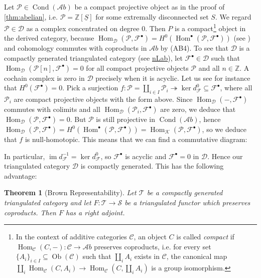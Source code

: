 \documentclass[11pt,A4]{article}
\theoremstyle{plain}
\newtheorem{thm}{Theorem}[section]
\theoremstyle{definition}
\theoremstyle{remark}
\newcommand{\Z}{\mathbb{Z}}
\newcommand{\1}{\mathbbm{1}}
\newcommand{\F}{\mathcal{F}}
\newcommand{\calP}{\mathcal{P}}
\newcommand{\scrC}{\mathscr{C}}
\newcommand{\Ab}{\mathscr{A}b}
\newcommand{\D}{\mathscr{D}}
\newcommand{\K}{\mathscr{K}}
\DeclareMathOperator{\Hom}{Hom}
\DeclareMathOperator{\Cond}{Cond}
\DeclareMathOperator{\Ob}{Ob}
\DeclareMathOperator{\im}{im}
\renewcommand{\u}[1]{\underline{#1}}
\newcommand{\grd}{^{\bullet}}
\begin{document}
Let $\calP\in \Cond(\Ab)$ be a compact projective object as in the proof of \cref{thm:abelian}, i.e. $\calP=\Z[\u{S}]$ for some extremally disconnected set $S$.
We regard $\calP\in \D$ as a complex concentrated on degree $0$.
Then $P$ is a compact\footnote{In the context of additive categories $\scrC$, an object $C$ is called \textit{compact} if $\Hom_{\scrC}(C,-)\colon \scrC\to \Ab$ preserves coproducts, i.e. for every set $\{A_{i}\}_{i\in I}\subseteq \Ob(\scrC)$ such that $\coprod_{i}A_{i}$ exists in $\scrC$, the canonical map $\coprod_{i}\Hom_{\scrC}(C,A_{i})\to \Hom_{\scrC}(C,\coprod_{i}A_{i})$ is a group isomorphism.} object in the derived category, because $\Hom_{\D}(\calP,\F\grd)=H^{0}(\Hom\grd(\calP,\F\grd))$ (see \cite[Proposition 1.4]{spa88}) and cohomology commutes with coproducts in $\Ab$ by (AB4).
To see that $\D$ is a compactly generated triangulated category (see \href{https://ncatlab.org/nlab/show/compactly+generated+triangulated+category}{nLab}), let $\F\grd\in \D$ such that $\Hom_{\D}(\calP[n],\F\grd)=0$ for all compact projective objects $\calP$ and all $n\in \Z$.
A cochain complex is zero in $\D$ precisely when it is acyclic.
Let us see for instance that $H^{0}(\F\grd)=0$.
Pick a surjection $f\colon \calP=\coprod_{i\in I}\calP_{i}\twoheadrightarrow \ker{d_{\F}^{0}}\subseteq \F\grd$, where all $\calP_{i}$ are compact projective objects with the form above.
Since $\Hom_{\D}(-,\F\grd)$ commutes with colimits and all $\Hom_{\D}(\calP_{i},\F\grd)$ are zero, we deduce that $\Hom_{\D}(\calP,\F\grd)=0$.
But $\calP$ is still projective in $\Cond(\Ab)$, hence $\Hom_{\D}(\calP,\F\grd)=H^{0}(\Hom\grd(\calP,\F\grd))=\Hom_{\K}(\calP,\F\grd)$, so we deduce that $f$ is null-homotopic.
This means that we can find a commutative diagram:
\begin{center}
\end{center}
In particular, $\im{d_{\F}^{-1}}=\ker{d_{\F}^{0}}$, so $\F\grd$ is acyclic and $\F\grd=0$ in $\D$.
Hence our triangulated category $\D$ is compactly generated.
This has the following advantage:

\begin{thm}[Brown Representability]
    Let $\mathscr{T}$ be a compactly generated triangulated category and let $F\colon \mathscr{T}\to \mathscr{S}$ be a triangulated functor which preserves coproducts.
    Then $F$ has a right adjoint.
\end{thm}



\end{document}
